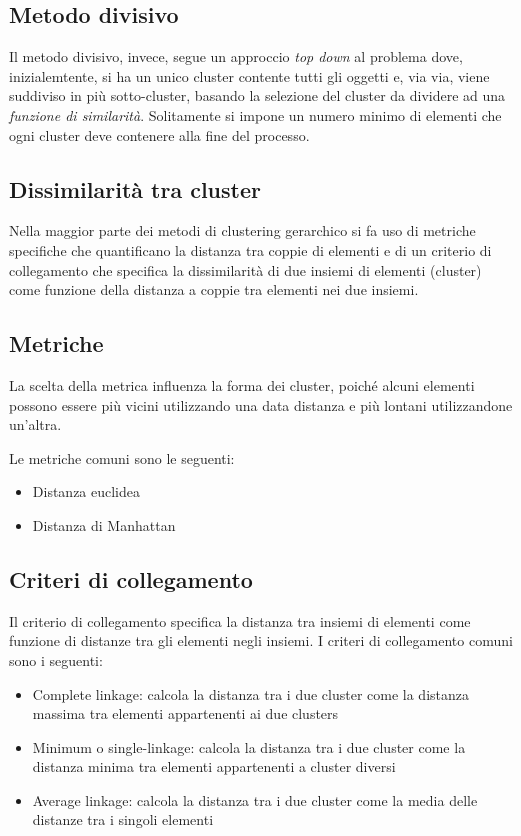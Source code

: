 	\subsection{Metodo divisivo}
		Il metodo divisivo, invece, segue un approccio \emph{top down} al problema dove, inizialemtente, si ha un unico cluster contente tutti gli oggetti e, via via, viene suddiviso in più sotto-cluster, basando la selezione del cluster da dividere ad una \emph{funzione di similarità}. Solitamente si impone un numero minimo di elementi che ogni cluster deve contenere alla fine del processo. 

	\subsection{Dissimilarità tra cluster}
		Nella maggior parte dei metodi di clustering gerarchico si fa uso di metriche specifiche che quantificano la distanza tra coppie di elementi e di un criterio di collegamento che specifica la dissimilarità di due insiemi di elementi (cluster) come funzione della distanza a coppie tra elementi nei due insiemi.

	\subsection{Metriche}
		La scelta della metrica influenza la forma dei cluster, poiché alcuni elementi possono essere più vicini utilizzando una data distanza e più lontani utilizzandone un'altra.

		Le metriche comuni sono le seguenti:
		\begin{itemize}
		  	\item Distanza euclidea
		  	\item Distanza di Manhattan
		\end{itemize}

	\subsection{Criteri di collegamento}
		Il criterio di collegamento specifica la distanza tra insiemi di elementi come funzione di distanze tra gli elementi negli insiemi.
		I criteri di collegamento comuni sono i seguenti:
		\begin{itemize}
			\item Complete linkage: calcola la distanza tra i due cluster come la distanza massima tra elementi appartenenti ai due clusters
			\item Minimum o single-linkage: calcola la distanza tra i due cluster come la distanza minima tra elementi appartenenti a cluster diversi
			\item Average linkage: calcola la distanza tra i due cluster come la media delle distanze tra i singoli elementi
		\end{itemize}

